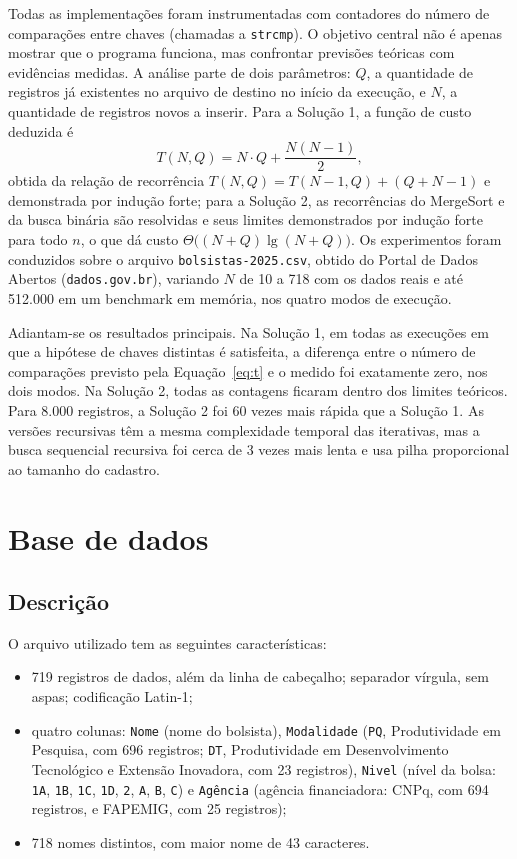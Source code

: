 \documentclass[11pt,a4paper]{article}
\begin{document}
Todas as implementações foram instrumentadas com contadores do número de comparações entre chaves (chamadas a \texttt{strcmp}). O objetivo central não é apenas mostrar que o programa funciona, mas confrontar previsões teóricas com evidências medidas. A análise parte de dois parâmetros: $Q$, a quantidade de registros já existentes no arquivo de destino no início da execução, e $N$, a quantidade de registros novos a inserir. Para a Solução 1, a função de custo deduzida é
\begin{equation}
T(N,Q)=N\cdot Q+\frac{N(N-1)}{2},
\label{eq:t}
\end{equation}
obtida da relação de recorrência $T(N,Q)=T(N-1,Q)+(Q+N-1)$ e demonstrada por indução forte; para a Solução 2, as recorrências do MergeSort e da busca binária são resolvidas e seus limites demonstrados por indução forte para todo $n$, o que dá custo $\Theta\big((N+Q)\lg(N+Q)\big)$. Os experimentos foram conduzidos sobre o arquivo \texttt{bolsistas-2025.csv}, obtido do Portal de Dados Abertos (\texttt{dados.gov.br}), variando $N$ de 10 a 718 com os dados reais e até 512.000 em um benchmark em memória, nos quatro modos de execução.

Adiantam-se os resultados principais. Na Solução 1, em todas as execuções em que a hipótese de chaves distintas é satisfeita, a diferença entre o número de comparações previsto pela Equação~\eqref{eq:t} e o medido foi exatamente zero, nos dois modos. Na Solução 2, todas as contagens ficaram dentro dos limites teóricos. Para 8.000 registros, a Solução 2 foi 60 vezes mais rápida que a Solução 1. As versões recursivas têm a mesma complexidade temporal das iterativas, mas a busca sequencial recursiva foi cerca de 3 vezes mais lenta e usa pilha proporcional ao tamanho do cadastro.

\section{Base de dados}

\subsection{Descrição}

O arquivo utilizado tem as seguintes características:

\begin{itemize}[itemsep=1pt]
  \item 719 registros de dados, além da linha de cabeçalho; separador vírgula, sem aspas; codificação Latin-1;
  \item quatro colunas: \texttt{Nome} (nome do bolsista), \texttt{Modalidade} (\texttt{PQ}, Produtividade em Pesquisa, com 696 registros; \texttt{DT}, Produtividade em Desenvolvimento Tecnológico e Extensão Inovadora, com 23 registros), \texttt{Nivel} (nível da bolsa: \texttt{1A}, \texttt{1B}, \texttt{1C}, \texttt{1D}, \texttt{2}, \texttt{A}, \texttt{B}, \texttt{C}) e \texttt{Agência} (agência financiadora: CNPq, com 694 registros, e FAPEMIG, com 25 registros);
  \item 718 nomes distintos, com maior nome de 43 caracteres.
\end{itemize}
\end{document}
